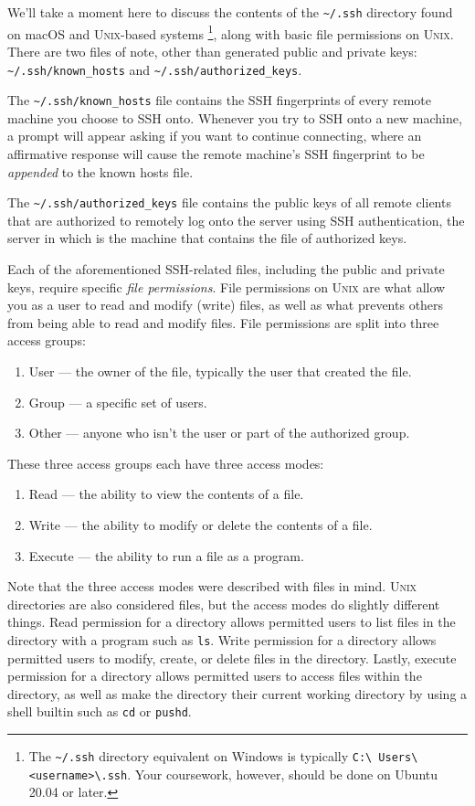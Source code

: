 We'll take a moment here to discuss the contents of the
\texttt{\textasciitilde/.ssh} directory found on macOS and
\textsc{Unix}-based systems \footnote{The \texttt{\textasciitilde/.ssh}
directory equivalent on Windows is typically \texttt{C:\textbackslash
Users\textbackslash<username>\textbackslash.ssh}. Your coursework,
however, should be done on Ubuntu 20.04 or later.}, along with basic
file permissions on \textsc{Unix}. There are two files of note, other
than generated public and private keys:
\texttt{\textasciitilde/.ssh/known\_hosts} and
\texttt{\textasciitilde/.ssh/authorized\_keys}.

The \texttt{\textasciitilde/.ssh/known\_hosts} file contains the SSH
fingerprints of every remote machine you choose to SSH onto. Whenever
you try to SSH onto a new machine, a prompt will appear asking if you
want to continue connecting, where an affirmative response will cause
the remote machine's SSH fingerprint to be \emph{appended} to the known
hosts file.

The \texttt{\textasciitilde/.ssh/authorized\_keys} file contains the
public keys of all remote clients that are authorized to remotely log
onto the server using SSH authentication, the server in which is the
machine that contains the file of authorized keys.

Each of the aforementioned SSH-related files, including the public and
private keys, require specific \emph{file permissions}. File permissions
on \textsc{Unix} are what allow you as a user to read and modify (write)
files, as well as what prevents others from being able to read and
modify files. File permissions are split into three access groups:
\begin{enumerate}
  \item User --- the owner of the file, typically the user that created
    the file.
  \item Group --- a specific set of users.
  \item Other --- anyone who isn't the user or part of the authorized
    group.
\end{enumerate}
These three access groups each have three access modes:
\begin{enumerate}
  \item Read --- the ability to view the contents of a file.
  \item Write --- the ability to modify or delete the contents of a
    file.
  \item Execute --- the ability to run a file as a program.
\end{enumerate}
Note that the three access modes were described with files in mind.
\textsc{Unix} directories are also considered files, but the access
modes do slightly different things. Read permission for a directory
allows permitted users to list files in the directory with a program such as
\texttt{ls}. Write permission for a directory allows permitted users to
modify, create, or delete files in the directory. Lastly, execute
permission for a directory allows permitted users to access files within
the directory, as well as make the directory their current working
directory by using a shell builtin such as \texttt{cd} or
\texttt{pushd}.

